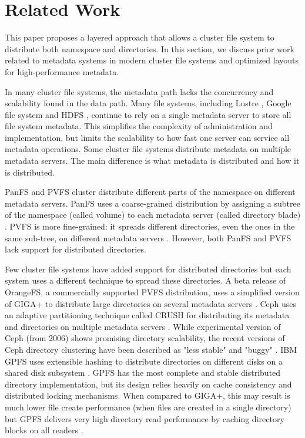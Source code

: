 \section{Related Work}
\label{relatedwork}

This paper proposes a layered approach that allows a cluster file system to 
distribute both namespace and directories. In this section, we discuss prior
work related to metadata systems in modern cluster file systems and optimized
layouts for high-performance metadata.

In many cluster file systems, the metadata path lacks the concurrency and 
scalability found in the data path.
Many file systems, including Lustre \cite{lustre}, Google file system
\cite{gfs:ghemawat03} and HDFS \cite{HDFS}, continue to rely on a single
metadata server to store all file system metadata. This simplifies the
complexity of administration and implementation, but limits the scalability to 
how fast one server can service all metadata operations. 
Some cluster file systems distribute metadata on multiple metadata servers. The 
main difference is what metadata is distributed and how it is distributed.

PanFS and PVFS cluster distribute different parts of the namespace on different
metadata servers.
PanFS uses a coarse-grained distribution by assigning a subtree of the
namespace (called volume) to each metadata server (called directory blade) 
\cite{panfs:welch08}.
PVFS is more fine-grained: it spreads different directories, even the ones in
the same sub-tree, on different metadata servers \cite{pvfs}.
However, both PanFS and PVFS lack support for distributed directories.

Few cluster file systems have added support for distributed directories but
each system uses a different technique to spread these directories.
A beta release of OrangeFS, a commercially supported PVFS distribution, uses a 
simplified version of GIGA+ to distribute large directories on several metadata 
servers \cite{OrangeFS}.
Ceph uses an adaptive partitioning technique called CRUSH for distributing its
metadata and directories on multiple metadata servers \cite{ceph:weil06}. While
experimental version of Ceph (from 2006) shows promising directory scalability,
the recent versions of Ceph directory clustering have been described as
"less stable" \cite{ceph-baddirs1:www} and "buggy" \cite{ceph-baddirs2:www}.
IBM GPFS uses extensible hashing to distribute directories on different disks on 
a shared disk subsystem \cite{gpfs:schmuck02}. GPFS has the most complete and
stable distributed directory implementation, but its design relies heavily on
cache consistency and distributed locking mechanisms. When compared to GIGA+,
this may result is much lower file create performance (when files are created
in a single directory) but GPFS delivers very high directory read performance 
by caching directory blocks on all readers \cite{GIGA11}.

